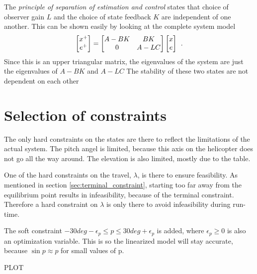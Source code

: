 The \textit{principle of separation of estimation and control} states that choice of observer gain $L$ and the choice of state feedback $K$ are independent of one another. This can be shown easily by looking at the complete system model
\begin{equation}
    \begin{bmatrix}x^+ \\ e^+\end{bmatrix} = \begin{bmatrix}A-BK & BK \\ 0 & A-LC\end{bmatrix} \begin{bmatrix}x \\ e\end{bmatrix} \: \: .
\end{equation}
Since this is an upper triangular matrix, the eigenvalues of the system are just the eigenvalues of $A - BK$ and $A - LC$
The stability of these two states are not dependent on each other


\section{Selection of constraints}

The only hard constraints on the states are there to reflect the limitations of the actual system. The pitch angel is limited, because this axis on the helicopter does not go all the way around. The elevation is also limited, mostly due to the table. 

One of the hard constraints on the travel, $\lambda$, is there to ensure feasibility. As mentioned in section \ref{sec:terminal_constraint}, starting too far away from the equilibrium point results in infeasibility, because of the terminal constraint. Therefore a hard constraint on $\lambda$ is only there to avoid infeasibility during run-time. 


The soft constraint $-30 deg - \epsilon_p \leq p \leq 30 deg + \epsilon_p$ is added, where $\epsilon_p \geq 0$ is also an optimization variable. This is so the linearized model will stay accurate, because $\sin p \approx p$ for small values of p.

PLOT

